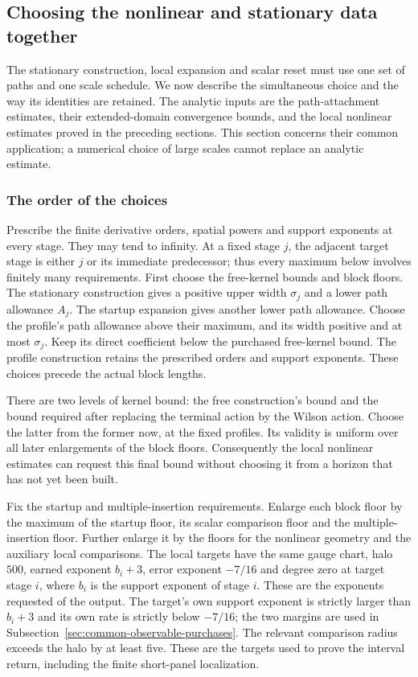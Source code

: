\subsection{Choosing the nonlinear and stationary data together}
\label{sec:common-funded-history}
The stationary construction, local expansion and scalar reset must use
one set of paths and one scale schedule. We now describe the simultaneous
choice and the way its identities are retained. The analytic inputs are
the path-attachment estimates, their extended-domain convergence bounds,
and the local nonlinear estimates proved in the preceding sections.
This section concerns their common application; a numerical choice of
large scales cannot replace an analytic estimate.

\subsubsection{The order of the choices}
Prescribe the finite derivative orders, spatial powers and support
exponents at every stage. They may tend to infinity. At a fixed stage
$j$, the adjacent target stage is either $j$ or its immediate predecessor;
thus every maximum below involves finitely many requirements.
First choose the free-kernel bounds and block floors. The stationary
construction gives a positive upper width $\sigma_j$ and a lower path
allowance $A_j$. The startup expansion gives another lower path
allowance. Choose the profile's path allowance above their maximum,
and its width positive and at most $\sigma_j$. Keep its direct
coefficient below the purchased free-kernel bound. The profile
construction retains the prescribed orders and support exponents.
These choices precede the actual block lengths.

There are two levels of kernel bound: the free construction's bound
and the bound required after replacing the terminal action by the
Wilson action. Choose the latter from the former now, at the fixed
profiles. Its validity is uniform over all later enlargements of the
block floors. Consequently the local nonlinear estimates can request
this final bound without choosing it from a horizon that has not yet
been built.

Fix the startup and multiple-insertion requirements. Enlarge each
block floor by the maximum of the startup floor, its scalar comparison
floor and the multiple-insertion floor. Further enlarge it by the
floors for the nonlinear geometry and the auxiliary local comparisons.
The local targets have the same gauge chart, halo $500$, earned
exponent $b_i+3$, error exponent $-7/16$ and degree zero at target
stage $i$, where $b_i$ is the support exponent of stage $i$. These are
the exponents requested of the output. The target's own support
exponent is strictly larger than $b_i+3$ and its own rate is strictly
below $-7/16$; the two margins are used in
Subsection~\ref{sec:common-observable-purchases}. The relevant comparison
radius exceeds the halo by at
least five. These are the targets used to prove the interval return,
including the finite short-panel localization.

